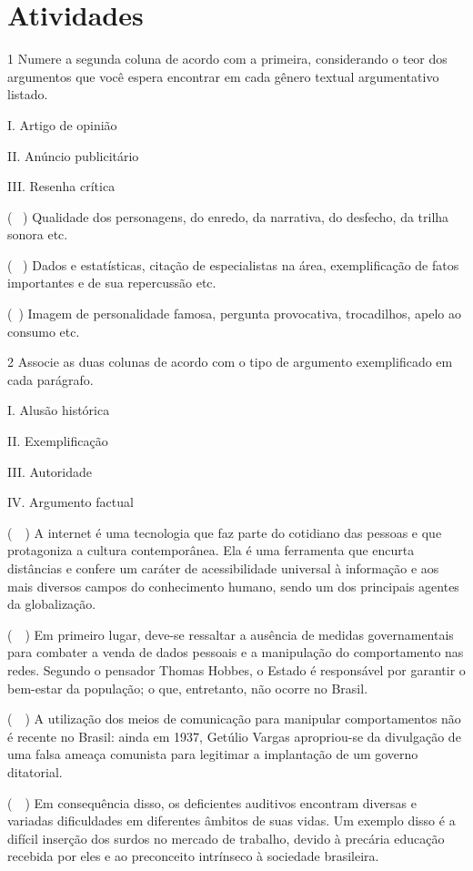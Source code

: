 \section{Atividades}

\num{1} Numere a segunda coluna de acordo com a primeira, considerando o
teor dos argumentos que você espera encontrar em cada gênero textual
argumentativo listado.

\begin{multicols}{2}
I. Artigo de opinião


II. Anúncio publicitário


III. Resenha crítica 
\columnbreak

(~ ) Qualidade dos personagens, do
enredo, da narrativa, do desfecho, da trilha sonora etc. 

(~ ) Dados e estatísticas, citação de
especialistas na área, exemplificação de fatos importantes e de sua
repercussão etc.

(~) Imagem de
personalidade famosa, pergunta provocativa, trocadilhos, apelo ao
consumo etc.
\end{multicols}

\num{2} Associe as duas colunas de acordo com o tipo de argumento
exemplificado em cada parágrafo.

\begin{multicols}{2}
I. Alusão histórica 

II. Exemplificação

III. Autoridade

IV. Argumento factual
\columnbreak

(~~) A internet é uma tecnologia que faz
parte do cotidiano das pessoas e que protagoniza a cultura
contemporânea. Ela é uma ferramenta que encurta distâncias e confere um
caráter de acessibilidade universal à informação e aos mais diversos
campos do conhecimento humano, sendo um dos principais agentes da globalização.

(~~) Em primeiro lugar,
deve-se ressaltar a ausência de medidas governamentais para combater a
venda de dados pessoais e a manipulação do comportamento nas redes.
Segundo o pensador Thomas Hobbes, o Estado é responsável por garantir o
bem-estar da população; o que, entretanto, não ocorre no Brasil.

(~~) A utilização dos meios de comunicação para
manipular comportamentos não é recente no Brasil: ainda em 1937, Getúlio
Vargas apropriou-se da divulgação de uma falsa ameaça comunista para
legitimar a implantação de um governo ditatorial. 

(~~) Em consequência disso, os deficientes auditivos
encontram diversas e variadas dificuldades em diferentes âmbitos de suas vidas. Um
exemplo disso é a difícil inserção dos surdos no mercado de trabalho,
devido à precária educação recebida por eles e ao preconceito intrínseco à sociedade brasileira.
\end{multicols}

